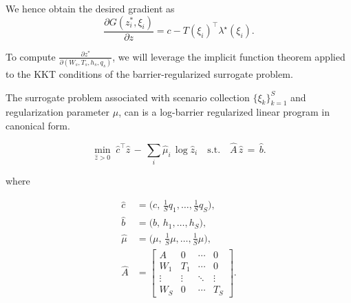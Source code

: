 \documentclass{article}
\begin{document}
We hence obtain the desired gradient as
\begin{equation}
\frac{\partial G(z^*_i,\xi_i)}{\partial z} = c - T(\xi_i)^\top \lambda^\star(\xi_i).
\end{equation}

To compute $\tfrac{\partial z^*}{\partial (W_s,T_s,h_s,q_s)}$, we will leverage the implicit function theorem applied to the KKT conditions of the barrier-regularized surrogate problem.

The surrogate problem associated with scenario collection $\{\xi_k\}_{k=1}^S$ and regularization parameter $\mu$, can is a log-barrier regularized linear program in canonical form.

\begin{equation}
    \label{eq:logbar_CanLP}
\min_{\hat z > 0} \; \hat c^\top \hat z \, - \, \sum_{i} \hat \mu_i \, \log \hat z_i \quad \text{s.t.} \quad \hat A \, \hat z \,=\, \hat b.
\end{equation}

where

\begin{subequations}\label{eq:surrogate-data}
\begin{align}
\hat c &= \big(c, \, \tfrac{1}{S}q_1,\dots,\tfrac{1}{S}q_S\big),\label{eq:surrogate-data-c}\\
\hat b &= \big(b, \, h_1,\dots,h_S\big),\label{eq:surrogate-data-b}\\
\hat \mu &= \big(\mu, \, \tfrac{1}{S}\mu,\dots,\tfrac{1}{S}\mu\big),\label{eq:surrogate-data-mu}\\[4pt]
\hat A &= \begin{bmatrix}
A & 0 & \cdots & 0 \\
W_1 & T_1 & \cdots & 0 \\
\vdots & \vdots & \ddots & \vdots \\
W_S & 0 & \cdots & T_S
\end{bmatrix}.\label{eq:surrogate-data-A}
\end{align}
\end{subequations}
\end{document}
